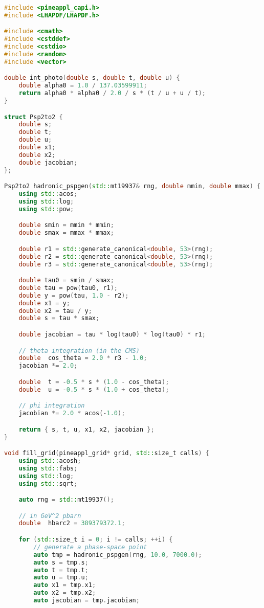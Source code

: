 \begin{lstlisting}[language=C++,mathescape=true]
#include <pineappl_capi.h>
#include <LHAPDF/LHAPDF.h>

#include <cmath>
#include <cstddef>
#include <cstdio>
#include <random>
#include <vector>

double int_photo(double s, double t, double u) {
    double alpha0 = 1.0 / 137.03599911;
    return alpha0 * alpha0 / 2.0 / s * (t / u + u / t);
}

struct Psp2to2 {
    double s;
    double t;
    double u;
    double x1;
    double x2;
    double jacobian;
};

Psp2to2 hadronic_pspgen(std::mt19937& rng, double mmin, double mmax) {
    using std::acos;
    using std::log;
    using std::pow;

    double smin = mmin * mmin;
    double smax = mmax * mmax;

    double r1 = std::generate_canonical<double, 53>(rng);
    double r2 = std::generate_canonical<double, 53>(rng);
    double r3 = std::generate_canonical<double, 53>(rng);

    double tau0 = smin / smax;
    double tau = pow(tau0, r1);
    double y = pow(tau, 1.0 - r2);
    double x1 = y;
    double x2 = tau / y;
    double s = tau * smax;

    double jacobian = tau * log(tau0) * log(tau0) * r1;

    // theta integration (in the CMS)
    double  cos_theta = 2.0 * r3 - 1.0;
    jacobian *= 2.0;

    double  t = -0.5 * s * (1.0 - cos_theta);
    double  u = -0.5 * s * (1.0 + cos_theta);

    // phi integration
    jacobian *= 2.0 * acos(-1.0);

    return { s, t, u, x1, x2, jacobian };
}

void fill_grid(pineappl_grid* grid, std::size_t calls) {
    using std::acosh;
    using std::fabs;
    using std::log;
    using std::sqrt;

    auto rng = std::mt19937();

    // in GeV^2 pbarn
    double  hbarc2 = 389379372.1;

    for (std::size_t i = 0; i != calls; ++i) {
        // generate a phase-space point
        auto tmp = hadronic_pspgen(rng, 10.0, 7000.0);
        auto s = tmp.s;
        auto t = tmp.t;
        auto u = tmp.u;
        auto x1 = tmp.x1;
        auto x2 = tmp.x2;
        auto jacobian = tmp.jacobian;


\end{lstlisting}
